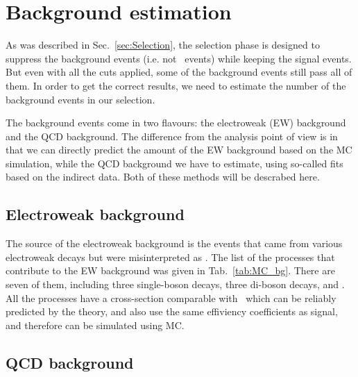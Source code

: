 \chapter{Background estimation}
\label{sec:Bkg}

As was described in Sec.~\ref{sec:Selection}, the selection phase is designed to suppress the background events (i.e. not \Zee\ events) while keeping the signal events. But even with all the cuts applied, some of the background events still pass all of them. In order to get the correct results, we need to estimate the number of the background events in our selection.

The background events come in two flavours: the electroweak (EW) background and the QCD background. The difference from the analysis point of view is in that we can directly predict the amount of the EW background based on the MC simulation, while the QCD background we have to estimate, using so-called fits based on the indirect data. Both of these methods will be descrabed here.

\section{Electroweak background}

The source of the electroweak background is the events that came from various electroweak decays but were misinterpreted as \Zee. The list of the processes that contribute to the EW background was given in Tab.~\ref{tab:MC_bg}. There are seven of them, including three single-boson decays, three di-boson decays, and \ttbar. All the processes have a cross-section comparable with \Zee\ which can be reliably predicted by the theory, and also use the same effiviency coefficients as signal, and therefore can be simulated using MC.

\section{QCD background}
